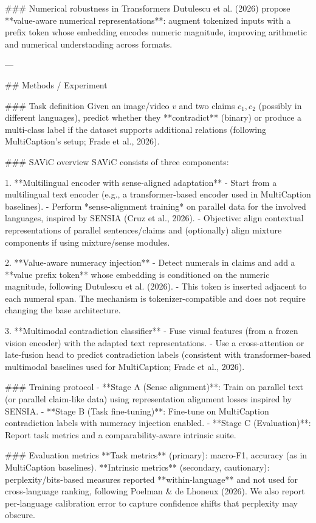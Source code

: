 ### Numerical robustness in Transformers  
Dutulescu et al. (2026) propose **value-aware numerical representations**: augment tokenized inputs with a prefix token whose embedding encodes numeric magnitude, improving arithmetic and numerical understanding across formats.

---

## Methods / Experiment  

### Task definition  
Given an image/video \(v\) and two claims \(c_1, c_2\) (possibly in different languages), predict whether they **contradict** (binary) or produce a multi-class label if the dataset supports additional relations (following MultiCaption’s setup; Frade et al., 2026).

### SAViC overview  
SAViC consists of three components:

1. **Multilingual encoder with sense-aligned adaptation**  
   - Start from a multilingual text encoder (e.g., a transformer-based encoder used in MultiCaption baselines).
   - Perform *sense-alignment training* on parallel data for the involved languages, inspired by SENSIA (Cruz et al., 2026).  
   - Objective: align contextual representations of parallel sentences/claims and (optionally) align mixture components if using mixture/sense modules.

2. **Value-aware numeracy injection**  
   - Detect numerals in claims and add a **value prefix token** whose embedding is conditioned on the numeric magnitude, following Dutulescu et al. (2026).  
   - This token is inserted adjacent to each numeral span. The mechanism is tokenizer-compatible and does not require changing the base architecture.

3. **Multimodal contradiction classifier**  
   - Fuse visual features (from a frozen vision encoder) with the adapted text representations.  
   - Use a cross-attention or late-fusion head to predict contradiction labels (consistent with transformer-based multimodal baselines used for MultiCaption; Frade et al., 2026).

### Training protocol  
- **Stage A (Sense alignment)**: Train on parallel text (or parallel claim-like data) using representation alignment losses inspired by SENSIA.  
- **Stage B (Task fine-tuning)**: Fine-tune on MultiCaption contradiction labels with numeracy injection enabled.  
- **Stage C (Evaluation)**: Report task metrics and a comparability-aware intrinsic suite.

### Evaluation metrics  
**Task metrics** (primary): macro-F1, accuracy (as in MultiCaption baselines).  
**Intrinsic metrics** (secondary, cautionary): perplexity/bits-based measures reported **within-language** and not used for cross-language ranking, following Poelman & de Lhoneux (2026). We also report per-language calibration error to capture confidence shifts that perplexity may obscure.

